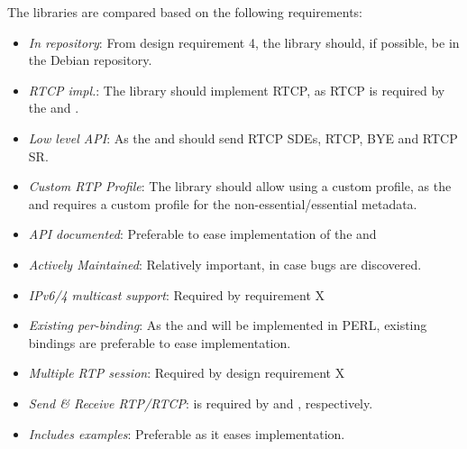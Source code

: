 The libraries are compared based on the following requirements:
\begin{itemize}
	\item \textit{In repository}: From design requirement 4, the library should, if possible, be in the Debian repository.
	\item \textit{RTCP impl.}: The library should implement RTCP, as RTCP is required by the \pub{} and \sub{}.
	\item \textit{Low level API}: As the \pub{} and \sub{} should send RTCP SDEs, RTCP, BYE and RTCP SR.
	\item \textit{Custom RTP Profile}: The library should allow using a custom profile, as the \pub{} and \sub{} requires a custom profile for the non-essential/essential metadata.
	\item \textit{API documented}: Preferable to ease implementation of the \pub{} and \sub{}
	\item \textit{Actively Maintained}: Relatively important, in case bugs are discovered.
	\item \textit{IPv6/4 multicast support}: Required by requirement X 
	\item \textit{Existing per-binding}: As the \pub{} and \sub{} will be implemented in PERL, existing bindings are preferable to ease implementation.
	\item \textit{Multiple RTP session}: Required by design requirement X
	\item \textit{Send \& Receive RTP/RTCP}: is required by \pub{} and \sub{}, respectively.
	\item \textit{Includes examples}: Preferable as it eases implementation.
\end{itemize}

